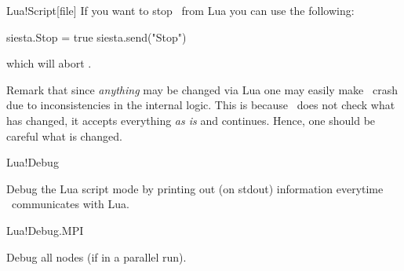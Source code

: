 \begin{fdfentry}{Lua!Script}[file]
  If you want to stop \siesta\ from Lua you can use the following:
  \begin{codeexample}
    siesta.Stop = true
    siesta.send({"Stop"})
  \end{codeexample}
  which will abort \siesta.

  Remark that since \emph{anything} may be changed via Lua one may
  easily make \siesta\ crash due to inconsistencies in the internal
  logic. This is because \siesta\ does not check what has changed, it
  accepts everything \emph{as is} and continues. Hence, one should be
  careful what is changed.
  
\end{fdfentry}

\begin{fdflogicalF}{Lua!Debug}

  Debug the Lua script mode by printing out (on stdout) information
  everytime \siesta\ communicates with Lua.
  
\end{fdflogicalF}

\begin{fdflogicalF}{Lua!Debug.MPI}

  Debug all nodes (if in a parallel run).
  
\end{fdflogicalF}


